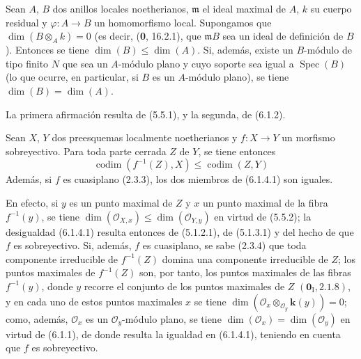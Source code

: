 \begin{corollary}[6.1.3]
Sean $A$, $B$ dos anillos locales noetherianos, $\mathfrak m$ el ideal maximal
de $A$, $k$ su cuerpo residual y $\varphi:A\to B$ un homomorfismo local.
Supongamos que $\dim(B\otimes_Ak)=0$ \textup{(es decir, (\textbf{0}, 16.2.1), que
$\mathfrak mB$ sea un} ideal de definición \textup{de $B$)}. Entonces se tiene
$\dim(B)\leq\dim(A)$. Si, además, existe un $B$-módulo de tipo finito $N$ que
sea un $A$-módulo plano y cuyo soporte sea igual a $\operatorname{Spec}(B)$
\textup{(lo que ocurre, en particular, si $B$ es un $A$-módulo} plano), se tiene
$\dim(B)=\dim(A)$.
\end{corollary}

La primera afirmación resulta de (5.5.1), y la segunda, de (6.1.2).

\begin{corollary}[6.1.4]
\label{IV.2.s6.1.4-fr}
Sean $X$, $Y$ dos preesquemas localmente noetherianos y $f:X\to Y$ un
morfismo sobreyectivo. Para toda parte cerrada $Z$ de $Y$, se tiene entonces
\begin{equation}
\operatorname{codim}(f^{-1}(Z),X)\leq\operatorname{codim}(Z,Y)
\tag{6.1.4.1}\label{IV.2.s6.1.4.1-fr}
\end{equation}
Además, si $f$ es cuasiplano \textup{(2.3.3)}, los dos miembros de \textup{(6.1.4.1)} son
iguales.
\end{corollary}

En efecto, si $y$ es un punto maximal de $Z$ y $x$ un punto maximal de la
fibra $f^{-1}(y)$, se tiene
$\dim(\mathcal O_{X,x})\leq\dim(\mathcal O_{Y,y})$ en virtud de (5.5.2);
la desigualdad (6.1.4.1) resulta entonces de (5.1.2.1), de (5.1.3.1) y del
hecho de que $f$ es sobreyectivo. Si, además, $f$ es cuasiplano, se sabe
(2.3.4) que toda componente irreducible de $f^{-1}(Z)$ domina una componente
irreducible de $Z$; los puntos maximales de $f^{-1}(Z)$ son, por tanto, los
puntos maximales de las fibras $f^{-1}(y)$, donde $y$ recorre el conjunto de
los puntos maximales de $Z$ $(\mathbf{0}_{\mathrm I}, 2.1.8)$, y en cada uno de estos
puntos maximales $x$ se tiene
$\dim(\mathcal O_x\otimes_{\mathcal O_y}\boldsymbol{k}(y))=0$; como, además,
$\mathcal O_x$ es un $\mathcal O_y$-módulo plano, se tiene
$\dim(\mathcal O_x)=\dim(\mathcal O_y)$ en virtud de (6.1.1), de donde
resulta la igualdad en (6.1.4.1), teniendo en cuenta que $f$ es sobreyectivo.
